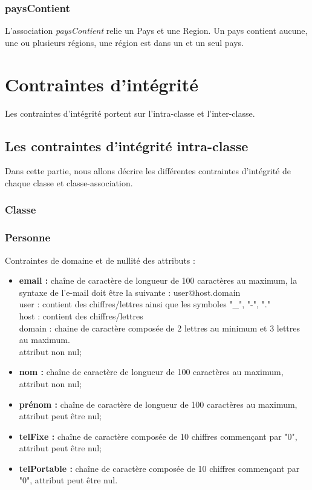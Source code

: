 \subsubsection*{paysContient}

L'association \textit{paysContient} relie un Pays et une Region. Un pays contient aucune, une ou plusieurs régions, une région est dans un et un seul pays.

\section{Contraintes d'intégrité}

Les contraintes d'intégrité portent sur l'intra-classe et l'inter-classe.

\subsection{Les contraintes d'intégrité intra-classe}
Dans cette partie, nous allons décrire les différentes contraintes d'intégrité de chaque classe et classe-association.

\subsubsection{Classe} 
 
\subsubsection*{Personne}
Contraintes de domaine et de nullité des attributs :
\begin{itemize}
	\item \textbf{email :} chaîne de caractère de longueur de 100 caractères au maximum, la syntaxe de l'e-mail doit être la suivante : user@host.domain\\
	user : contient des chiffres/lettres ainsi que les symboles "\_", "-", "." \\
	host : contient des chiffres/lettres \\
	domain : chaine de caractère composée de 2 lettres au minimum et 3 lettres au maximum. \\
	attribut non nul;  
 	\item \textbf{nom :} chaîne de caractère de longueur de 100 caractères au maximum, attribut non nul;
	\item \textbf{prénom :} chaîne de caractère de longueur de 100 caractères au maximum, attribut peut être nul;
	\item \textbf{telFixe :} chaîne de caractère composée de 10 chiffres commençant par "0", attribut peut être nul;
	\item \textbf{telPortable :} chaîne de caractère composée de 10 chiffres commençant par "0", attribut peut être nul.\\
\end{itemize}  

